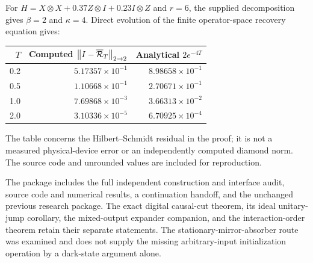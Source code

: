\documentclass[11pt,a4paper]{article}
\newcommand{\norm}[1]{\left\lVert #1\right\rVert}\newcommand{\ket}[1]{\lvert #1\rangle}\newcommand{\bra}[1]{\langle #1\rvert}
\begin{document}
For $H=X\otimes X+0.37Z\otimes I+0.23I\otimes Z$ and $r=6$, the supplied decomposition gives $\beta=2$ and $\kappa=4$. Direct evolution of the finite operator-space recovery equation gives:
\begin{center}
\begin{tabular}{@{}rrr@{}}
\toprule
$T$ & Computed $\norm{I-\overline{\cR}_T}_{2\to2}$ & Analytical $2e^{-4T}$ \\
\midrule
0.2 & $5.17357\times10^{-1}$ & $8.98658\times10^{-1}$ \\
0.5 & $1.10668\times10^{-1}$ & $2.70671\times10^{-1}$ \\
1.0 & $7.69868\times10^{-3}$ & $3.66313\times10^{-2}$ \\
2.0 & $3.10336\times10^{-5}$ & $6.70925\times10^{-4}$ \\
\bottomrule
\end{tabular}
\end{center}
The table concerns the Hilbert--Schmidt residual in the proof; it is not a measured physical-device error or an independently computed diamond norm. The source code and unrounded values are included for reproduction.

The package includes the full independent construction and interface audit, source code and numerical results, a continuation handoff, and the unchanged previous research package. The exact digital causal-cut theorem, its ideal unitary-jump corollary, the mixed-output expander companion, and the interaction-order theorem retain their separate statements. The stationary-mirror-absorber route was examined and does not supply the missing arbitrary-input initialization operation by a dark-state argument alone.
\end{document}
